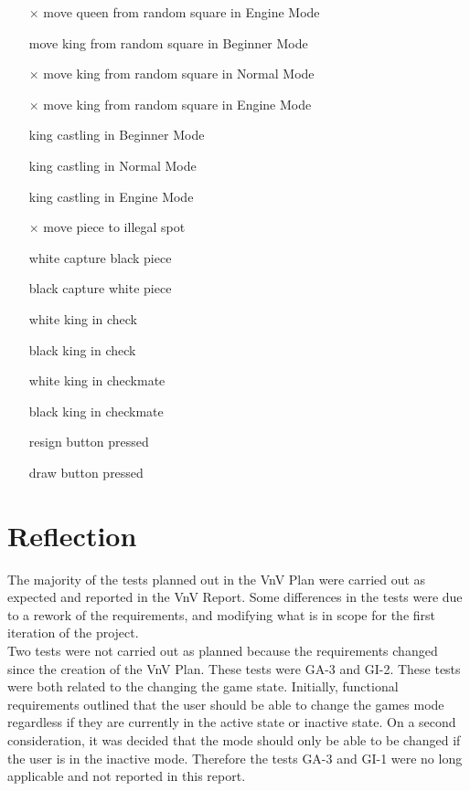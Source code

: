 \documentclass[12pt, titlepage]{article}
\begin{document}
\begin{itemize}
  \item[$\times$] move queen from random square in Engine Mode
  \item[\checkmark] move king from random square in Beginner Mode
  \item[$\times$] move king from random square in Normal Mode
  \item[$\times$] move king from random square in Engine Mode
  \item[\checkmark] king castling in Beginner Mode
  \item[\checkmark] king castling in Normal Mode
  \item[\checkmark] king castling in Engine Mode
  \item[$\times$] move piece to illegal spot
  \item[\checkmark] white capture black piece
  \item[\checkmark] black capture white piece
  \item[\checkmark] white king in check
  \item[\checkmark] black king in check
  \item[\checkmark] white king in checkmate
  \item[\checkmark] black king in checkmate
  \item[\checkmark] resign button pressed
  \item[\checkmark] draw button pressed
\end{itemize}

\section{Reflection}
The majority of the tests planned out in the VnV Plan were carried out as expected and reported in the VnV Report. 
Some differences in the tests were due to a rework of the requirements, and modifying what is in scope for the first iteration of the project.\\

Two tests were not carried out as planned because the requirements changed since the creation of the VnV Plan. These tests were GA-3 and GI-2.
These tests were both related to the changing the game state. Initially, functional requirements outlined that the user should be able to change the games mode
regardless if they are currently in the active state or inactive state. On a second consideration, it was decided that the mode should only be able to be changed if
the user is in the inactive mode. Therefore the tests GA-3 and GI-1 were no long applicable and not reported in this report. \\
\end{document}
